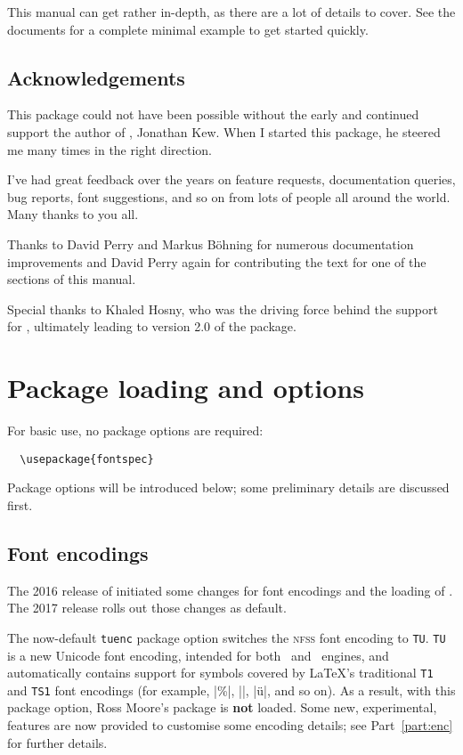 \documentclass[a4paper]{l3doc}
\begin{document}
This manual can get rather in-depth, as there are a lot of details
to cover. See the documents  for a complete minimal example
to get started quickly.


\subsection{Acknowledgements}

This package could not have been possible without the early and continued support
the author of \XeTeX, Jonathan Kew. When I started this package, he steered
me many times in the right direction.

I've had great
feedback over the years on feature requests, documentation queries, bug reports, font suggestions, and so on from lots of people all around the world.
Many thanks to you all.

Thanks to David Perry and Markus B\"ohning for numerous documentation
improvements and David Perry again for contributing the text for one of the
sections of this manual.

Special thanks to Khaled Hosny, who was the driving force behind the support for \LuaLaTeX, ultimately leading to version 2.0 of the package.



\section{Package loading and options}

For basic use, no package options are required:
\begin{Verbatim}
  \usepackage{fontspec}
\end{Verbatim}
Package options will be introduced below; some preliminary details are discussed first.


\subsection{Font encodings}
The 2016 release of  initiated some changes for font encodings and the loading of .
The 2017 release rolls out those changes as default.

The now-default \texttt{tuenc} package option switches the \textsc{nfss} font encoding to \texttt{TU}.
\texttt{TU} is a new Unicode font encoding, intended for both \XeTeX\ and \LuaTeX\ engines, and automatically contains support for symbols covered by \LaTeX's traditional \texttt{T1} and \texttt{TS1} font encodings (for example, |\%|, |\textbullet|, |\"u|, and so on).
As a result, with this package option, Ross Moore's  package is \textbf{not} loaded.
Some new, experimental, features are now provided to customise some encoding details; see Part~\vref{part:enc} for further details.
\end{document}
